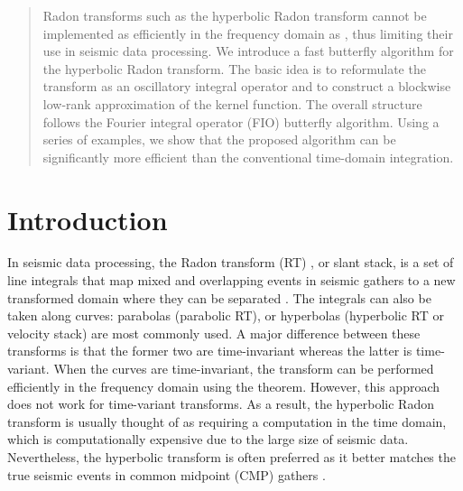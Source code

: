 \begin{abstract}
 Radon transforms such as the hyperbolic Radon transform cannot be implemented as efficiently in the frequency domain as , thus limiting their use in seismic data processing. We introduce a fast butterfly algorithm for the hyperbolic Radon transform. The basic idea is to reformulate the transform as an oscillatory integral operator and to construct a blockwise low-rank approximation of the kernel function. The overall structure follows the Fourier integral operator (FIO) butterfly algorithm.  Using a series of examples, we show that the proposed algorithm can be significantly more efficient than the conventional time-domain integration.
\end{abstract}



\section{Introduction}

In seismic data processing, the Radon transform (RT) \citep{Radon17}, or slant stack, is a set of line integrals that map mixed and overlapping events in seismic gathers to a new transformed domain where they can be separated \citep{GL91}. The integrals can also be taken along curves: parabolas (parabolic RT), or hyperbolas (hyperbolic RT or velocity stack) are most commonly used. A major difference between these transforms is that the former two are time-invariant  whereas the latter is time-variant. When the curves are time-invariant, the transform can be performed efficiently in the frequency domain using the  theorem. However, this approach does not work for time-variant transforms. As a result, the hyperbolic Radon transform is usually thought of as requiring a computation in the time domain, which is computationally expensive due to the large size of seismic data. Nevertheless, the hyperbolic transform is often preferred as it better matches the true seismic events in common midpoint (CMP) gathers \citep{TC85}.

